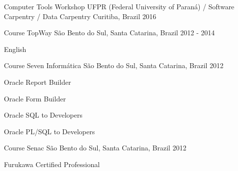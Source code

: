

\begin{cventries}

  \cventry
	{Computer Tools Workshop} %
	{UFPR (Federal University of Paraná) / Software Carpentry / Data Carpentry} %
	{Curitiba, Brazil} %
	{2016} %
	{
	}

  \cventry
    {Course} %
    {TopWay} %
    {São Bento do Sul, Santa Catarina, Brazil} %
    {2012 - 2014} %
    {
      \begin{cvitems} %
        \item {English}
      \end{cvitems}
    }

  \cventry
    {Course} %
    {Seven Informática} %
    {São Bento do Sul, Santa Catarina, Brazil} %
    {2012} %
    {
      \begin{cvitems} %
        \item {Oracle Report Builder}
        \item {Oracle Form Builder}
        \item {Oracle SQL to Developers}
        \item {Oracle PL/SQL to Developers}
      \end{cvitems}
    }

  \cventry
	{Course} %
	{Senac} %
	{São Bento do Sul, Santa Catarina, Brazil} %
	{2012} %
	{
	    \begin{cvitems} %
	      \item {Furukawa Certified Professional}
	    \end{cvitems}
	}


\end{cventries}
